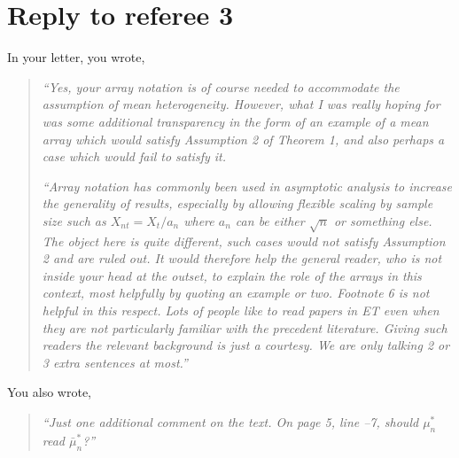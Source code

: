 \documentclass[12pt]{article}
\begin{document}
\section*{\hfill Reply to referee 3\hfill}

In your letter, you wrote,
\begin{quotation}
  \noindent\textit{``Yes, your array notation is of course needed to
    accommodate the assumption of mean heterogeneity. However, what I
    was really hoping for was some additional transparency in the form
    of an example of a mean array which would satisfy Assumption 2 of
    Theorem 1, and also perhaps a case which would fail to satisfy
    it.}

  \textit{``Array notation has commonly been used in asymptotic
    analysis to increase the generality of results, especially by
    allowing flexible scaling by sample size such as
    $X_{nt} = X_t/a_n$ where $a_n$ can be either $\sqrt{n}$ or
    something else. The object here is quite different, such cases
    would not satisfy Assumption 2 and are ruled out. It would
    therefore help the general reader, who is not inside your head at
    the outset, to explain the role of the arrays in this context,
    most helpfully by quoting an example or two. Footnote 6 is not
    helpful in this respect. Lots of people like to read papers in ET
    even when they are not particularly familiar with the precedent
    literature. Giving such readers the relevant background is just a
    courtesy. We are only talking 2 or 3 extra sentences at most.''}
\end{quotation}


You also wrote,
\begin{quotation}
  \noindent\textit{``Just one additional comment on the text. On page
    5, line --7, should $\mu_n^*$ read $\bar{\mu}_n^*$?''}
\end{quotation}
\end{document}
